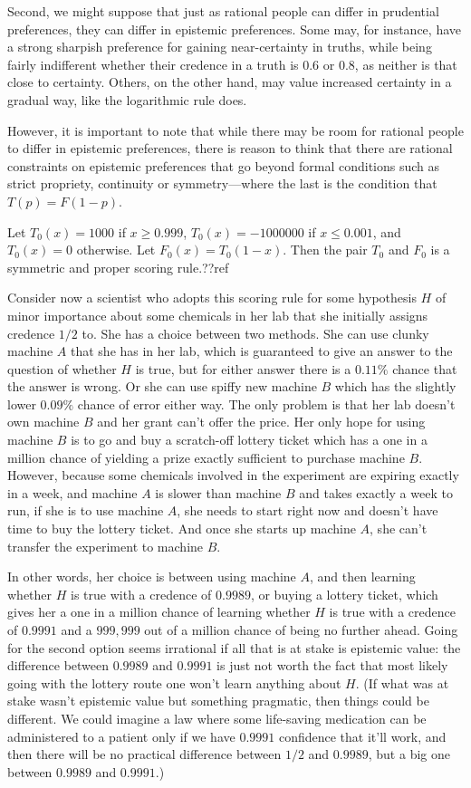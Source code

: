 Second, we might suppose that just as rational people can differ in prudential preferences, they can differ in epistemic preferences.
Some may, for instance, have a strong sharpish preference for gaining near-certainty in truths, while being fairly indifferent whether their
credence in a truth is $0.6$ or $0.8$, as neither is that close to certainty. Others, on the other hand, may value increased certainty in
a gradual way, like the logarithmic rule does.

However, it is important to note that while there may be room for rational people to differ in epistemic preferences, there is reason to
think that there are rational constraints on epistemic preferences that go beyond formal conditions such as strict propriety, continuity
or symmetry---where the last is the condition that $T(p)=F(1-p)$. 

Let $T_0(x)=1000$ if $x\ge 0.999$, $T_0(x)=-1000000$ if $x \le 0.001$, and $T_0(x)=0$ otherwise. Let $F_0(x)=T_0(1-x)$.
Then the pair $T_0$ and $F_0$ is a symmetric and proper scoring rule.??ref

Consider now a scientist who adopts this scoring rule for some hypothesis $H$ of minor importance about some chemicals in 
her lab that she initially assigns credence $1/2$ to. She has a choice between two methods. She can use clunky machine $A$
that she has in her lab, which is guaranteed to give an answer to the question of whether $H$ is true, but for either
answer there is a $0.11\%$ chance that the answer is wrong. Or she can use spiffy new machine $B$ which has the slightly lower $0.09\%$ chance 
of error either way. The only problem is that her lab doesn't own machine $B$ and her grant can't offer the price. Her only 
hope for using machine $B$ is to go and buy a scratch-off lottery ticket which has a one in a million chance of yielding a prize exactly
sufficient to purchase machine $B$. However, because some chemicals involved in the experiment are expiring exactly in a week, and 
machine $A$ is slower than machine $B$ and takes exactly a week to run, if she is to use machine $A$, she needs to start right now
and doesn't have time to buy the lottery ticket. And once she starts up machine $A$, she can't transfer the experiment to
machine $B$. 

In other words, her choice is between using machine $A$, and then learning whether $H$ is true with a credence of
$0.9989$, or buying a lottery ticket, which gives her a one in a million chance of learning whether $H$ is true with
a credence of $0.9991$ and a $999,999$ out of a million chance of being no further ahead. Going for the second option
seems irrational if all that is at stake is epistemic value: the difference between $0.9989$ and $0.9991$ is just not
worth the fact that most likely going with the lottery route one won't learn anything about $H$. (If what was at stake
wasn't epistemic value but something pragmatic, then things could be different. We could imagine a law where some 
life-saving medication can be administered to a patient only if we have $0.9991$ confidence that it'll work, and then
there will be no practical difference between $1/2$ and $0.9989$, but a big one between $0.9989$ and $0.9991$.) 

